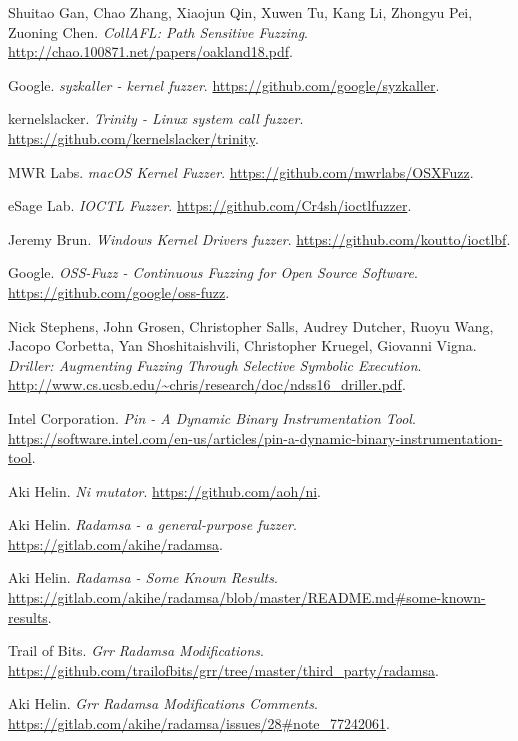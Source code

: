 \begin{thebibliography}{99}
  Shuitao Gan, Chao Zhang, Xiaojun Qin, Xuwen Tu, Kang Li, Zhongyu Pei, Zuoning Chen.
  \textit{CollAFL: Path Sensitive Fuzzing}.
  \url{http://chao.100871.net/papers/oakland18.pdf}.

  Google.
  \textit{syzkaller - kernel fuzzer}.
  \url{https://github.com/google/syzkaller}.

  kernelslacker.
  \textit{Trinity - Linux system call fuzzer}.
  \url{https://github.com/kernelslacker/trinity}.

  MWR Labs.
  \textit{macOS Kernel Fuzzer}.
  \url{https://github.com/mwrlabs/OSXFuzz}.

  eSage Lab.
  \textit{IOCTL Fuzzer}.
  \url{https://github.com/Cr4sh/ioctlfuzzer}.

  Jeremy Brun.
  \textit{Windows Kernel Drivers fuzzer}.
  \url{https://github.com/koutto/ioctlbf}.

  Google.
  \textit{OSS-Fuzz - Continuous Fuzzing for Open Source Software}.
  \url{https://github.com/google/oss-fuzz}.

  Nick Stephens, John Grosen, Christopher Salls, Audrey Dutcher, Ruoyu Wang,
  Jacopo Corbetta, Yan Shoshitaishvili, Christopher Kruegel, Giovanni Vigna.
  \textit{Driller: Augmenting Fuzzing Through Selective Symbolic Execution}.
  \url{http://www.cs.ucsb.edu/~chris/research/doc/ndss16_driller.pdf}.

  Intel Corporation.
  \textit{Pin - A Dynamic Binary Instrumentation Tool}.
  \url{https://software.intel.com/en-us/articles/pin-a-dynamic-binary-instrumentation-tool}.

  Aki Helin.
  \textit{Ni mutator}.
  \url{https://github.com/aoh/ni}.

  Aki Helin.
  \textit{Radamsa - a general-purpose fuzzer}.
  \url{https://gitlab.com/akihe/radamsa}.

  Aki Helin.
  \textit{Radamsa - Some Known Results}.
  \url{https://gitlab.com/akihe/radamsa/blob/master/README.md#some-known-results}.

  Trail of Bits.
  \textit{Grr Radamsa Modifications}.
  \url{https://github.com/trailofbits/grr/tree/master/third_party/radamsa}.

  Aki Helin.
  \textit{Grr Radamsa Modifications Comments}.
  \url{https://gitlab.com/akihe/radamsa/issues/28#note_77242061}.


\end{thebibliography}
